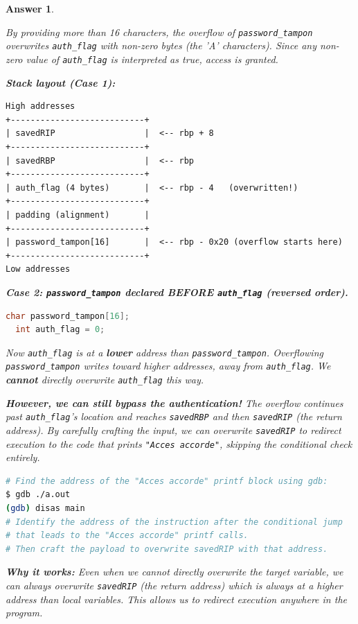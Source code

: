 \documentclass[a4paper,11pt]{article}
\theoremstyle{plain}
\newtheorem{correction}{Answer}
\theoremstyle{definition}
\begin{document}
\begin{correction}
\begin{enumerate}
By providing more than 16 characters, the overflow of \texttt{password\_tampon} overwrites \texttt{auth\_flag} with non-zero bytes (the 'A' characters). Since any non-zero value of \texttt{auth\_flag} is interpreted as true, access is granted.

\medskip
\textbf{Stack layout (Case 1):}
\begin{lstlisting}[numbers=none,frame=none,backgroundcolor=\color{white}]
High addresses
+---------------------------+
| savedRIP                  |  <-- rbp + 8
+---------------------------+
| savedRBP                  |  <-- rbp
+---------------------------+
| auth_flag (4 bytes)       |  <-- rbp - 4   (overwritten!)
+---------------------------+
| padding (alignment)       |
+---------------------------+
| password_tampon[16]       |  <-- rbp - 0x20 (overflow starts here)
+---------------------------+
Low addresses
\end{lstlisting}

\medskip
\textbf{Case 2: \texttt{password\_tampon} declared BEFORE \texttt{auth\_flag} (reversed order).}

\begin{lstlisting}[language=C,numbers=none]
  char password_tampon[16];
  int auth_flag = 0;
\end{lstlisting}

Now \texttt{auth\_flag} is at a \textbf{lower} address than \texttt{password\_tampon}. Overflowing \texttt{password\_tampon} writes toward higher addresses, away from \texttt{auth\_flag}. We \textbf{cannot} directly overwrite \texttt{auth\_flag} this way.

\medskip
\textbf{However, we can still bypass the authentication!} The overflow continues past \texttt{auth\_flag}'s location and reaches \texttt{savedRBP} and then \texttt{savedRIP} (the return address). By carefully crafting the input, we can overwrite \texttt{savedRIP} to redirect execution to the code that prints \texttt{"Acces accorde"}, skipping the conditional check entirely.

\begin{lstlisting}[language=bash,numbers=none]
# Find the address of the "Acces accorde" printf block using gdb:
$ gdb ./a.out
(gdb) disas main
# Identify the address of the instruction after the conditional jump
# that leads to the "Acces accorde" printf calls.
# Then craft the payload to overwrite savedRIP with that address.
\end{lstlisting}

\textbf{Why it works:} Even when we cannot directly overwrite the target variable, we can always overwrite \texttt{savedRIP} (the return address) which is always at a higher address than local variables. This allows us to redirect execution anywhere in the program.


\end{enumerate}
\end{correction}
\end{document}
